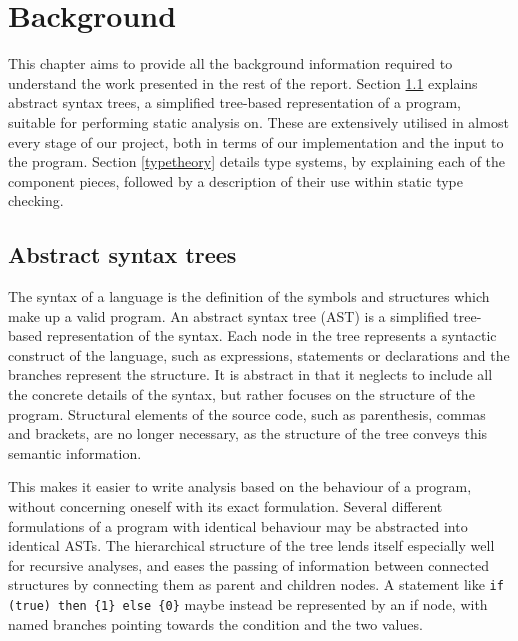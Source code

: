 \documentclass[nofilelist]{cslthse-msc}
\newcommand{\CR}[1]{\textcolor{green!60!black}{[\textbf{CR}:#1]}}
\begin{document}
\chapter{Background}
This chapter aims to provide all the background information required to understand the work presented in the rest of the report.
Section \ref{abstractsyntaxtrees} explains abstract syntax trees, a simplified tree-based representation of a program, suitable for performing static analysis on.
These are extensively utilised in almost every stage of our project, both in terms of our implementation and the input to the program.
Section \ref{typetheory} details type systems, by explaining each of the component pieces, followed by a description of their use within static type checking.

\section{Abstract syntax trees}\label{abstractsyntaxtrees}
The syntax of a language is the definition of the symbols and structures which make up a valid program.
An abstract syntax tree (AST) is a simplified tree-based representation of the syntax.
Each node in the tree represents a syntactic construct of the language, such as expressions, statements or declarations and the branches represent the structure.
It is abstract in that it neglects to include all the concrete details of the syntax, but rather focuses on the structure of the program.
Structural elements of the source code, such as parenthesis, commas and brackets, are no longer necessary, as the structure of the tree conveys this semantic information.

This makes it easier to write analysis based on the behaviour of a program, without concerning oneself with its exact formulation.
Several different formulations of a program with identical behaviour may be abstracted into identical ASTs.
The hierarchical structure of the tree lends itself especially well for recursive analyses, and eases the passing of information between connected structures by connecting them as parent and children nodes.
A statement like \verb|if (true) then {1} else {0}| maybe instead be represented by an if node, with named branches pointing towards the condition and the two values.
\end{document}
